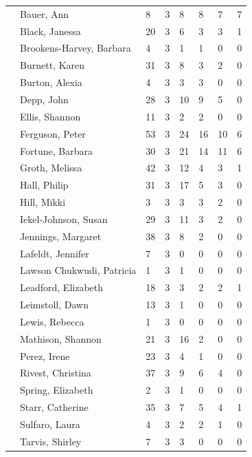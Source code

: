 \documentclass{article}\usepackage[]{graphicx}\usepackage[]{color}
\begin{document}
{\begin{longtable} { >{\raggedright}p{}p{}p{}p{}p{}p{}p{}p{}}
   \rowcolor[gray]{0.90} & Bauer, Ann & 8 & 3 & 8 & 8 & 7 & 7 \\ 
   & Black, Janessa & 20 & 3 & 6 & 3 & 3 & 1 \\ 
   & Brookens-Harvey, Barbara & 4 & 3 & 1 & 1 & 0 & 0 \\ 
   & Burnett, Karen & 31 & 3 & 8 & 3 & 2 & 0 \\ 
   \rowcolor[gray]{0.90} & Burton, Alexia & 4 & 3 & 3 & 3 & 0 & 0 \\ 
   \rowcolor[gray]{0.90} & Depp, John & 28 & 3 & 10 & 9 & 5 & 0 \\ 
   \rowcolor[gray]{0.90} & Ellis, Shannon & 11 & 3 & 2 & 2 & 0 & 0 \\ 
   & Ferguson, Peter & 53 & 3 & 24 & 16 & 10 & 6 \\ 
   & Fortune, Barbara & 30 & 3 & 21 & 14 & 11 & 6 \\ 
   & Groth, Melissa & 42 & 3 & 12 & 4 & 3 & 1 \\ 
   \rowcolor[gray]{0.90} & Hall, Philip & 31 & 3 & 17 & 5 & 3 & 0 \\ 
   \rowcolor[gray]{0.90} & Hill, Mikki & 3 & 3 & 3 & 3 & 2 & 0 \\ 
   \rowcolor[gray]{0.90} & Iekel-Johnson, Susan & 29 & 3 & 11 & 3 & 2 & 0 \\ 
   & Jennings, Margaret & 38 & 3 & 8 & 2 & 0 & 0 \\ 
   & Lafeldt, Jennifer & 7 & 3 & 0 & 0 & 0 & 0 \\ 
   & Lawson Chukwudi, Patricia & 1 & 3 & 1 & 0 & 0 & 0 \\ 
   \rowcolor[gray]{0.90} & Leadford, Elizabeth & 18 & 3 & 3 & 2 & 2 & 1 \\ 
   \rowcolor[gray]{0.90} & Leimstoll, Dawn & 13 & 3 & 1 & 0 & 0 & 0 \\ 
   \rowcolor[gray]{0.90} & Lewis, Rebecca & 1 & 3 & 0 & 0 & 0 & 0 \\ 
   & Mathison, Shannon & 21 & 3 & 16 & 2 & 0 & 0 \\ 
   & Perez, Irene & 23 & 3 & 4 & 1 & 0 & 0 \\ 
   & Rivest, Christina & 37 & 3 & 9 & 6 & 4 & 0 \\ 
   \rowcolor[gray]{0.90} & Spring, Elizabeth & 2 & 3 & 1 & 0 & 0 & 0 \\ 
   \rowcolor[gray]{0.90} & Starr, Catherine & 35 & 3 & 7 & 5 & 4 & 1 \\ 
   \rowcolor[gray]{0.90} & Sulfaro, Laura & 4 & 3 & 2 & 2 & 1 & 0 \\ 
   & Tarvis, Shirley & 7 & 3 & 3 & 0 & 0 & 0 \\ 

\end{longtable}}
\end{document}
